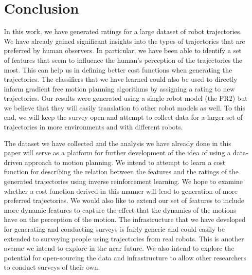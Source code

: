 \documentclass[letterpaper, 10 pt, conference]{ieeeconf}  %
\begin{document}
\section{Conclusion}
\label{sec:conclusion}
In this work, we have generated ratings for a large dataset of robot trajectories. We have already gained significant insights into the 
types of trajectories that are preferred by human observers. In particular, we have been able to identify a set of features that seem to influence 
the human's perception of the trajectories the most. This can help us in defining better cost functions when generating the trajectories. The classifiers 
that we have learned could also be used to directly inform gradient free motion planning algorithms by assigning a rating to new trajectories. Our 
results were generated using a single robot model (the PR2) but we believe that they will easily translation to other robot models as well. To this end, 
we will keep the survey open and attempt to collect data for a larger set of trajectories in 
more environments and with different robots. 

The dataset we have collected and the analysis we have already done in this paper will serve as a
 platform for further development of the idea of using 
a data-driven approach to motion planning. We intend to attempt to learn a cost function for describing the relation between the features and 
the ratings of the generated trajectories using inverse reinforcement learning. We hope to examine whether a cost function derived in this manner will 
lead to generation of more preferred trajectories. We would also like to extend our set of features to include more dynamic features to capture the effect 
that the dynamics of the motions have on the perception of the motion. The infrastructure that we have developed for generating and conducting 
surveys is fairly generic and could easily be extended to surveying people using trajectories from real robots. This is another avenue we intend to explore 
in the near future. We also intend to explore the potential for open-sourcing the data and infrastructure to allow other researchers to conduct surveys of their own. 

\end{document}
